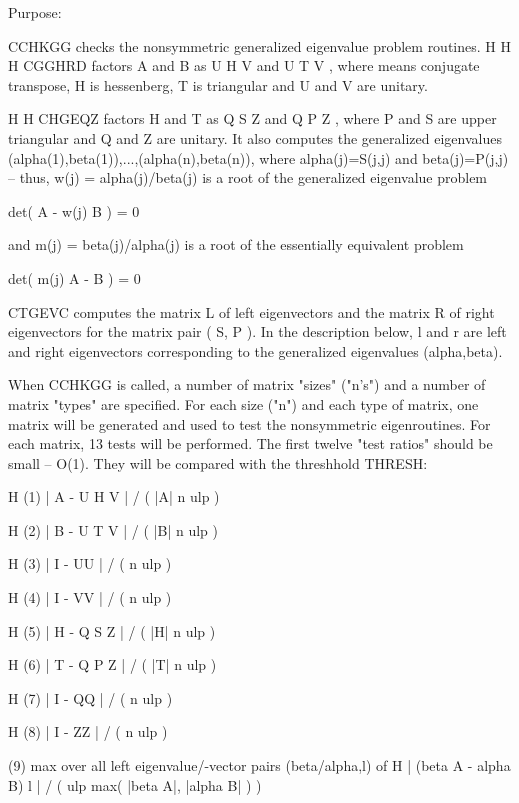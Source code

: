 \begin{DoxyParagraph}{Purpose\+: }
\begin{DoxyVerb} CCHKGG  checks the nonsymmetric generalized eigenvalue problem
 routines.
                                H          H        H
 CGGHRD factors A and B as U H V  and U T V , where   means conjugate
 transpose, H is hessenberg, T is triangular and U and V are unitary.

                                 H          H
 CHGEQZ factors H and T as  Q S Z  and Q P Z , where P and S are upper
 triangular and Q and Z are unitary.  It also computes the generalized
 eigenvalues (alpha(1),beta(1)),...,(alpha(n),beta(n)), where
 alpha(j)=S(j,j) and beta(j)=P(j,j) -- thus, w(j) = alpha(j)/beta(j)
 is a root of the generalized eigenvalue problem

     det( A - w(j) B ) = 0

 and m(j) = beta(j)/alpha(j) is a root of the essentially equivalent
 problem

     det( m(j) A - B ) = 0

 CTGEVC computes the matrix L of left eigenvectors and the matrix R
 of right eigenvectors for the matrix pair ( S, P ).  In the
 description below,  l and r are left and right eigenvectors
 corresponding to the generalized eigenvalues (alpha,beta).

 When CCHKGG is called, a number of matrix "sizes" ("n's") and a
 number of matrix "types" are specified.  For each size ("n")
 and each type of matrix, one matrix will be generated and used
 to test the nonsymmetric eigenroutines.  For each matrix, 13
 tests will be performed.  The first twelve "test ratios" should be
 small -- O(1).  They will be compared with the threshhold THRESH:

                  H
 (1)   | A - U H V  | / ( |A| n ulp )

                  H
 (2)   | B - U T V  | / ( |B| n ulp )

               H
 (3)   | I - UU  | / ( n ulp )

               H
 (4)   | I - VV  | / ( n ulp )

                  H
 (5)   | H - Q S Z  | / ( |H| n ulp )

                  H
 (6)   | T - Q P Z  | / ( |T| n ulp )

               H
 (7)   | I - QQ  | / ( n ulp )

               H
 (8)   | I - ZZ  | / ( n ulp )

 (9)   max over all left eigenvalue/-vector pairs (beta/alpha,l) of
                           H
       | (beta A - alpha B) l | / ( ulp max( |beta A|, |alpha B| ) )


\end{DoxyVerb}
\end{DoxyParagraph}
